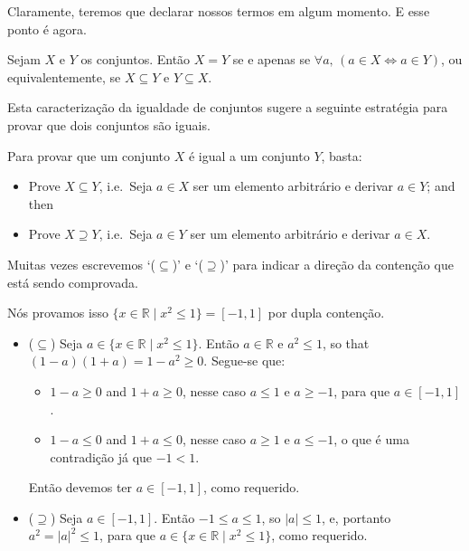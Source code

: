 Claramente, teremos que declarar nossos termos em algum momento. E esse ponto é agora.

\begin{axiom}
\label{axSetEquality}
Sejam $X$ e $Y$ os conjuntos. Então $X=Y$ se e apenas se $\forall a,\, (a \in X \Leftrightarrow a \in Y)$, ou equivalentemente, se $X \subseteq Y$ e $Y \subseteq X$.
\end{axiom}

Esta caracterização da igualdade de conjuntos sugere a seguinte estratégia para provar que dois
conjuntos são iguais.

\begin{strategy}
Para provar que um conjunto $X$ é igual a um conjunto $Y$, basta:
\begin{itemize}
\item Prove $X \subseteq Y$, i.e.\ Seja $a \in X$ ser um elemento arbitrário e derivar $a \in Y$; and then
\item Prove $X \supseteq Y$, i.e.\ Seja $a \in Y$ ser um elemento arbitrário e derivar $a \in X$.
\end{itemize}
Muitas vezes escrevemos `($\subseteq$)' e `($\supseteq$)' para indicar a direção da contenção que está sendo comprovada.
\end{strategy}

\begin{example}
\label{exPositiveNegativeSetBuilderNotation}
Nós provamos isso $\{ x \in \mathbb{R} \mid x^2 \le 1 \} = [-1,1]$ por dupla contenção.
\begin{itemize}
\item ($\subseteq$) Seja $a \in \{ x \in \mathbb{R} \mid x^2 \le 1 \}$. Então $a \in \mathbb{R}$ e $a^2 \le 1$, so that $(1-a)(1+a) = 1-a^2 \ge 0$. Segue-se que:
\begin{itemize}
\item $1-a \ge 0$ and $1+a \ge 0$, nesse caso $a \le 1$ e $a \ge -1$, para que $a \in [-1,1]$.
\item $1-a \le 0$ and $1+a \le 0$, nesse caso $a \ge 1$ e $a \le -1$, o que é uma contradição já que $-1 < 1$.
\end{itemize}
Então devemos ter $a \in [-1,1]$, como requerido.

\item ($\supseteq$) Seja $a \in [-1,1]$. Então $-1 \le a \le 1$, so $|a| \le 1$, e, portanto $a^2 = |a|^2 \le 1$, para que $a \in \{ x \in \mathbb{R} \mid x^2 \le 1 \}$, 
como requerido.
\end{itemize}
\end{example}

